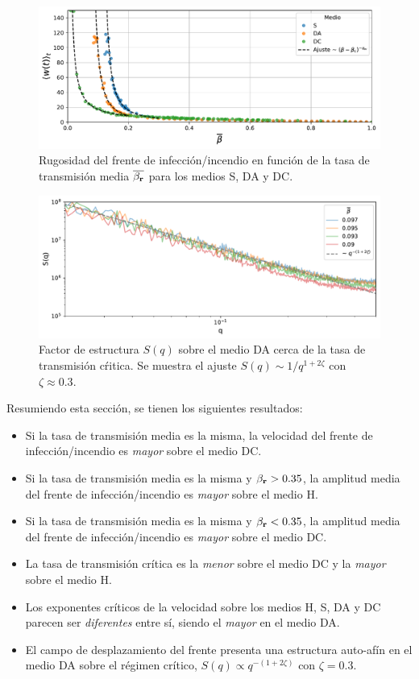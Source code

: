 \begin{figure}[h]
    \centering
    \includegraphics[width=\imsizeL]{width_beta.pdf}
    \caption{Rugosidad del frente de infección/incendio en función de la tasa 
    de transmisión media $\overline{\beta_{\vb r}}$ para los medios S, DA y DC.}
    \label{width_beta}
\end{figure}

\begin{figure}[h]
    \centering
    \includegraphics[width=\imsizeL]{factor.pdf}
    \caption{Factor de estructura $S(q)$ sobre el medio DA cerca de la tasa de transmisión cŕitica. Se muestra el ajuste $S(q)\sim 1/q^{1+2\zeta}$ con $\zeta\approx 0.3$.}
    \label{fig:factor}
\end{figure}

Resumiendo esta sección, se tienen los siguientes resultados:
\begin{itemize}
    \item Si la tasa de transmisión media es la misma, la velocidad del frente de infección/incendio es \textit{mayor} sobre el medio DC.
    \item Si la tasa de transmisión media es la misma y $\beta_{\vb r}>0.35$, la amplitud media del frente de infección/incendio es \textit{mayor} sobre el medio H.
    \item Si la tasa de transmisión media es la misma y $\beta_{\vb r}<0.35$, la amplitud media del frente de infección/incendio es \textit{mayor} sobre el medio DC.
    \item La tasa de transmisión crítica es la \textit{menor} sobre el medio DC y la \textit{mayor} sobre el medio H.
    \item Los exponentes críticos de la velocidad sobre los medios H, S, DA y DC parecen ser \textit{diferentes} entre sí, siendo el \textit{mayor} en el medio DA.
    \item El campo de desplazamiento del frente presenta una estructura auto-afín en el medio DA sobre el régimen crítico, $S(q)\propto q^{-(1+2\zeta)}$ con $\zeta=0.3$.
\end{itemize}

